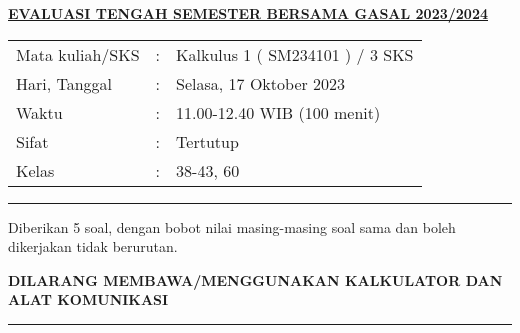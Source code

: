 \documentclass[10pt,openany,a4paper]{article}
\begin{document}
    \begin{center}
	{\underline{\textbf{\MakeUppercase{Evaluasi Tengah Semester Bersama Gasal 2023/2024}}}}
    \end{center}

    \begin{center}
	\begin{tabular}{lcl}
		Mata kuliah/SKS & : & Kalkulus 1 ( SM234101 ) / 3 SKS\\
		Hari, Tanggal & : & Selasa, 17 Oktober 2023\\
		Waktu & : & 11.00-12.40 WIB (100 menit)\\
		Sifat & : & Tertutup\\
		Kelas & : & 38-43, 60
	\end{tabular}
    \end{center}
	
    \noindent\rule{\textwidth}{2.pt}
	
    \setlength{\parindent}{5pt}
    \par Diberikan 5 soal, dengan bobot nilai masing-masing soal sama dan boleh dikerjakan tidak berurutan.
    \setlength{\parindent}{5pt}
    \setlength{\parindent}{5pt}
    {\small
    \par \textbf{\MakeUppercase{Dilarang membawa/menggunakan kalkulator dan alat komunikasi}}
    }
    \par {}
	
    \noindent\rule{\textwidth}{2.pt}
	
\end{document}
